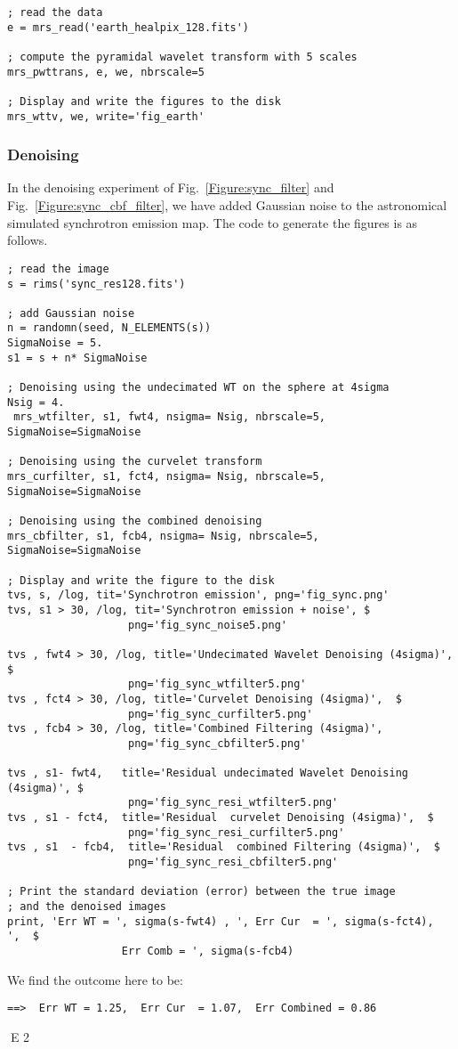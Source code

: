 \begin{verbatim}
; read the data 
e = mrs_read('earth_healpix_128.fits')

; compute the pyramidal wavelet transform with 5 scales
mrs_pwttrans, e, we, nbrscale=5

; Display and write the figures to the disk
mrs_wttv, we, write='fig_earth'
\end{verbatim}


\subsubsection{Denoising}
In the denoising experiment of Fig.~\ref {Figure:sync_filter} and Fig.~\ref{Figure:sync_cbf_filter}, 
we have added Gaussian noise to the astronomical simulated synchrotron emission map.
The code to generate the figures is as follows.
\begin{verbatim}
; read the image
s = rims('sync_res128.fits')

; add Gaussian noise
n = randomn(seed, N_ELEMENTS(s))
SigmaNoise = 5.
s1 = s + n* SigmaNoise
 
; Denoising using the undecimated WT on the sphere at 4sigma
Nsig = 4.
 mrs_wtfilter, s1, fwt4, nsigma= Nsig, nbrscale=5, SigmaNoise=SigmaNoise

; Denoising using the curvelet transform
mrs_curfilter, s1, fct4, nsigma= Nsig, nbrscale=5, SigmaNoise=SigmaNoise

; Denoising using the combined denoising
mrs_cbfilter, s1, fcb4, nsigma= Nsig, nbrscale=5, SigmaNoise=SigmaNoise

; Display and write the figure to the disk
tvs, s, /log, tit='Synchrotron emission', png='fig_sync.png'
tvs, s1 > 30, /log, tit='Synchrotron emission + noise', $
                   png='fig_sync_noise5.png'

tvs , fwt4 > 30, /log, title='Undecimated Wavelet Denoising (4sigma)', $
                   png='fig_sync_wtfilter5.png'
tvs , fct4 > 30, /log, title='Curvelet Denoising (4sigma)',  $
                   png='fig_sync_curfilter5.png'
tvs , fcb4 > 30, /log, title='Combined Filtering (4sigma)',  
                   png='fig_sync_cbfilter5.png'

tvs , s1- fwt4,   title='Residual undecimated Wavelet Denoising (4sigma)', $
                   png='fig_sync_resi_wtfilter5.png'
tvs , s1 - fct4,  title='Residual  curvelet Denoising (4sigma)',  $
                   png='fig_sync_resi_curfilter5.png'
tvs , s1  - fcb4,  title='Residual  combined Filtering (4sigma)',  $
                   png='fig_sync_resi_cbfilter5.png'

; Print the standard deviation (error) between the true image 
; and the denoised images
print, 'Err WT = ', sigma(s-fwt4) , ', Err Cur  = ', sigma(s-fct4),  ',  $
                  Err Comb = ', sigma(s-fcb4)

\end{verbatim}

We find the outcome here to be:

\begin{verbatim}
==>  Err WT = 1.25,  Err Cur  = 1.07,  Err Combined = 0.86
\end{verbatim}


E 2
